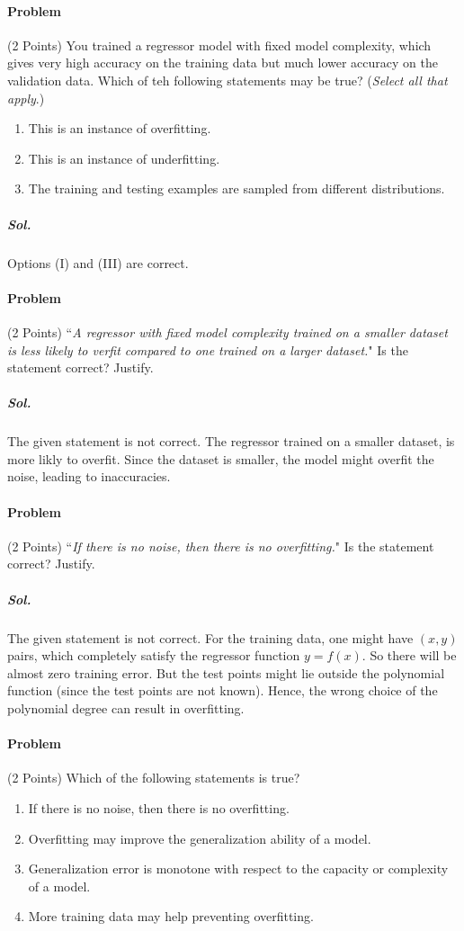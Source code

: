 \documentclass{scrartcl}
\newcounter{prob}
\newenvironment{problem}[1]{\stepcounter{prob}\paragraph{Problem \theprob} (#1 Points)}{}
\begin{document}
	\pagebreak
	
	\begin{problem}{2}
		You trained a regressor model with fixed model complexity, which gives very high accuracy on the training data but much lower accuracy on the validation data. Which of teh following statements may be true? (\textit{Select all that apply}.)
		
		\begin{enumerate}[label*=\Roman*.]
			\item This is an instance of overfitting.
			\item This is an instance of underfitting.
			\item The training and testing examples are sampled from different distributions.
		\end{enumerate}
	\end{problem}
	
	\subparagraph{Sol.} Options (I) and (III) are correct.
	
	\begin{problem}{2}
		``\textit{A regressor with fixed model complexity trained on a smaller dataset is less likely to verfit compared to one trained on a larger dataset.}" Is the statement correct? Justify.
	\end{problem}
	
	\subparagraph{Sol.} The given statement is not correct. The regressor trained on a smaller dataset, is more likly to overfit. Since the dataset is smaller, the model might overfit the noise, leading to inaccuracies.
	
	\begin{problem}{2}
		``\textit{If there is no noise, then there is no overfitting.}" Is the statement correct? Justify.
	\end{problem}
	
	\subparagraph{Sol.} The given statement is not correct. For the training data, one might have \((x,y)\) pairs, which completely satisfy the regressor function \(y=f(x)\). So there will be almost zero training error. But the test points might lie outside the polynomial function (since the test points are not known). Hence, the wrong choice of the polynomial degree can result in overfitting.
	
	\begin{problem}{2}
		Which of the following statements is true?
		
		\begin{enumerate}[label*=\Roman*.]
			\item If there is no noise, then there is no overfitting.
			\item Overfitting may improve the generalization ability of a model.
			\item Generalization error is monotone with respect to the capacity or complexity of a model.
			\item More training data may help preventing overfitting.
		\end{enumerate}
	\end{problem}
	
\end{document}
